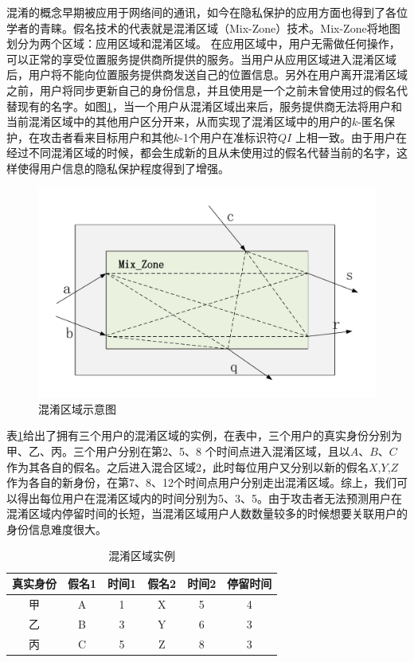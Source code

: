 混淆的概念早期被应用于网络间的通讯，如今在隐私保护的应用方面也得到了各位学者的青睐。假名技术的代表就是混淆区域（Mix-Zone）技术。Mix-Zone将地图划分为两个区域：应用区域和混淆区域\cite{Mix}。 在应用区域中，用户无需做任何操作，可以正常的享受位置服务提供商所提供的服务。当用户从应用区域进入混淆区域后，用户将不能向位置服务提供商发送自己的位置信息。另外在用户离开混淆区域之前，用户将同步更新自己的身份信息，并且使用是一个之前未曾使用过的假名代替现有的名字。如图\ref{fig:mix_zone_pdf}，当一个用户从混淆区域出来后，服务提供商无法将用户和当前混淆区域中的其他用户区分开来，从而实现了混淆区域中的用户的$k$-匿名保护，在攻击者看来目标用户和其他$k$-1个用户在准标识符$QI$ 上相一致。由于用户在经过不同混淆区域的时候，都会生成新的且从未使用过的假名代替当前的名字，这样使得用户信息的隐私保护程度得到了增强。
\begin{figure}[H]
\centering
\includegraphics[width=12cm]{fig/mix_zone.pdf}
\caption{混淆区域示意图} %
\label{fig:mix_zone_pdf}
\end{figure}
表\ref{mix}给出了拥有三个用户的混淆区域的实例，在表中，三个用户的真实身份分别为甲、乙、丙。三个用户分别在第2、5、8 个时间点进入混淆区域，且以$A$、$B$、$C$ 作为其各自的假名。之后进入混合区域2，此时每位用户又分别以新的假名$X$,$Y$,$Z$作为各自的新身份，在第7、8、12个时间点用户分别走出混淆区域。综上，我们可以得出每位用户在混淆区域内的时间分别为5、3、5。由于攻击者无法预测用户在混淆区域内停留时间的长短，当混淆区域用户人数数量较多的时候想要关联用户的身份信息难度很大。
\begin{table}[H]
\label{mix}
\centering  %
\begin{tabular}{cccccc}  %
\hline
真实身份 &假名1&时间1 &假名2&时间2&停留时间\\ \hline  %
甲 &A &1 &X &5 &4\\         %
乙 &B &3 &Y &6 &3\\        %
丙 &C &5 &Z &8 &3\\ \hline
\end{tabular}
\caption{混淆区域实例}
\end{table}

